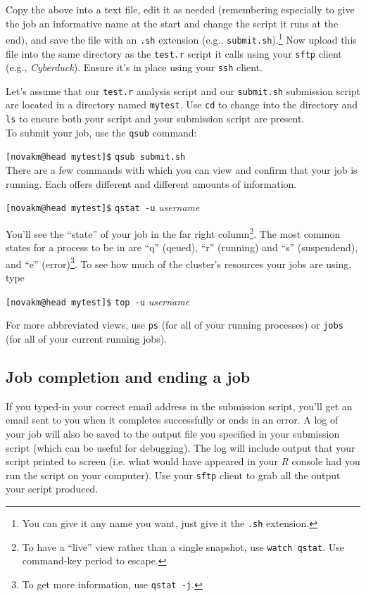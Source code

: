 \documentclass[12pt,letterpaper]{article}
\begin{document}
Copy the above into a text file, edit it as needed (remembering especially to give the job an informative name at the start and change the script it runs at the end), and save the file with an \texttt{.sh} extension (e.g., \texttt{submit.sh}).\footnote{You can give it any name you want, just give it the \texttt{.sh} extension.}
Now upload this file into the same directory as the \texttt{test.r} script it calls using your \texttt{sftp} client (e.g., \emph{Cyberduck}).
Ensure it's in place using your \texttt{ssh} client.

Let's assume that our \texttt{test.r} analysis script and our \texttt{submit.sh} submission script are located in a directory named \texttt{mytest}.
Use \texttt{cd} to change into the directory and \texttt{ls} to ensure both your script and your submission script are present.\\

\noindent
To submit your job, use the \texttt{qsub} command:

\texttt{[novakm@head mytest]\$} \texttt{qsub submit.sh}
\\

\noindent
There are a few commands with which you can view and confirm that your job is running.
Each offers different and different amounts of information.

\texttt{[novakm@head mytest]\$} \texttt{qstat -u} \emph{username}

\noindent
You'll see the ``state'' of your job in the far right column\footnote{To have a ``live'' view rather than a single snapshot, use \texttt{watch qstat}.  Use command-key period to escape.}.
The most common states for a process to be in are ``q'' (qeued), ``r'' (running) and ``s'' (suspendend), and ``e'' (error)\footnote{To get more information, use \texttt{qstat -j}.}.
To see how much of the cluster's resources your jobs are using, type

\texttt{[novakm@head mytest]\$} \texttt{top -u} \emph{username}

\noindent
For more abbreviated views, use \texttt{ps} (for all of your running processes) or \texttt{jobs} (for all of your current running jobs).


\subsection{Job completion and ending a job}
If you typed-in your correct email address in the submission script, you'll get an email sent to you when it completes successfully or ends in an error.
A log of your job will also be saved to the output file you specified in your submission script (which can be useful for debugging).
The log will include output that your script printed to screen (i.e. what would have appeared in your \emph{R} console had you run the script on your computer).
Use your \texttt{sftp} client to grab all the output your script produced.
\end{document}
